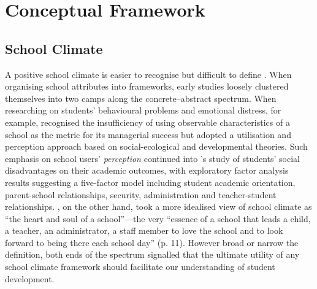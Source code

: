 \section{Conceptual Framework}
\label{sec:2}






\subsection{School Climate}

A positive school climate is easier to recognise but difficult to define \parencite{PISAvol3}. When organising school attributes into frameworks, early studies loosely clustered themselves into two camps along the concrete--abstract spectrum. When researching on students' behavioural problems and emotional distress, for example, \textcite{kuperminc:1997} recognised the insufficiency of using observable characteristics of a school as the metric for its managerial success but adopted a utilisation and perception approach based on social-ecological and developmental theories. Such emphasis on school users' \emph{perception} continued into \textcite{esposito:1999}'s study of students' social disadvantages on their academic outcomes, with exploratory factor analysis results suggesting a five-factor model including student academic orientation, parent-school relationships, security, administration and teacher-student relationships. \textcite{freiberg:1999}, on the other hand, took a more idealised view of school climate as ``the heart and soul of a school''---the very ``essence of a school that leads a child, a teacher, an administrator, a staff member to love the school and to look forward to being there each school day'' (p. 11). However broad or narrow the definition, both ends of the spectrum signalled that the ultimate utility of any school climate framework should facilitate our understanding of student development.


